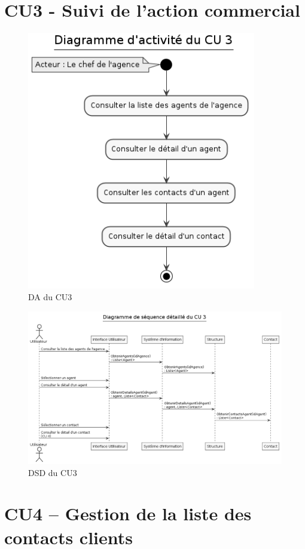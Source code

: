\clearpage
\section{CU3 - Suivi de l’action commercial}

\begin{figure}[H]
\centering
\includegraphics[width=10cm]{figures/DA_CU3.png}
\caption{DA du CU3}
\end{figure}

\begin{figure}[H]
\centering
\includegraphics[width=\textwidth]{figures/DSD_CU3.png}
\caption{DSD du CU3}
\end{figure}

\clearpage
\section{CU4 – Gestion de la liste des contacts clients}


